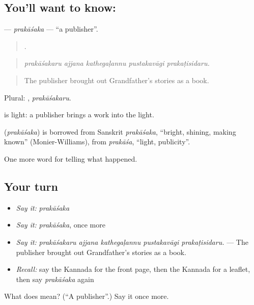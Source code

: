 \subsection*{You'll want to know: }
\textbf{} — \emph{prakāśaka} — \textquotedblleft{}a publisher\textquotedblright{}.

\begin{quote}
    .
\end{quote}

\begin{quote}
\emph{prakāśakaru ajjana kathegaḷannu pustakavāgi prakaṭisidaru.}
\end{quote}

\begin{quote}
The publisher brought out Grandfather's stories as a book.
\end{quote}

Plural: , \emph{prakāśakaru}.

 is light: a publisher brings a work into the light.

\begin{cousinweb}
\textbf{} (\emph{prakāśaka}) is borrowed from Sanskrit \emph{prakāśaka}, \textquotedblleft{}bright, shining, making known\textquotedblright{} (Monier-Williams), from \emph{prakāśa}, \textquotedblleft{}light, publicity\textquotedblright{}.
\end{cousinweb}

\begin{grammarlens}[title={What you've built}]
One more word for telling what happened.
\end{grammarlens}

\subsection*{Your turn}
\begin{itemize}
\raggedright
  \item \emph{Say it:} \emph{prakāśaka}
  \item \emph{Say it:} \emph{prakāśaka}, once more
  \item \emph{Say it:} \emph{prakāśakaru ajjana kathegaḷannu pustakavāgi prakaṭisidaru.} — The publisher brought out Grandfather's stories as a book.
  \item \emph{Recall:} say the Kannada for the front page, then the Kannada for a leaflet, then say \emph{prakāśaka} again
\end{itemize}

\begin{tcolorbox}[breakable,colback=teal!4,colframe=teal!35!black,title={Before you move on}]
What does  mean? (\textquotedblleft{}A publisher\textquotedblright{}.) Say it once more.
\end{tcolorbox}
